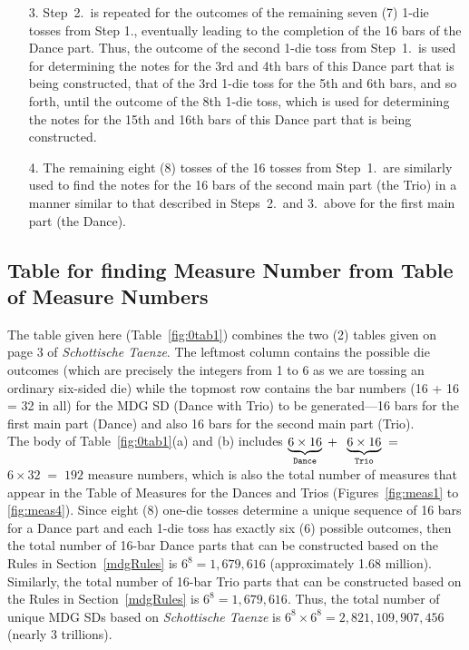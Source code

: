\documentclass[a4paper,x11names,svgnames,10pt]{article}
\begin{document}
{\begin{enumerate}
	\item[3.\label{step3}] Step~2.\ is repeated for the outcomes of the remaining seven (7) 1-die tosses from Step 1., eventually leading to the completion of the 16 bars of the Dance part. Thus, the outcome of the second 1-die toss from Step~1.\ is used for determining the notes for the 3rd and 4th bars of this Dance part that is being constructed, that of the 3rd 1-die toss for the 5th and 6th bars, and so forth, until the outcome of the 8th 1-die toss, which is used for determining the notes for the 15th and 16th bars of this Dance part that is being constructed. 
	
	\item[4.] The remaining eight (8) tosses of the 16 tosses from Step~1.\ are similarly used to find the notes for the 16 bars of the second main part (the Trio) in a manner similar to that described in Steps~2.\ and 3.\ above for the first main part (the Dance).
\end{enumerate}   

\subsection{Table for finding Measure Number from Table of Measure Numbers}\label{tabFind}
The table given here (Table~\ref{fig:0tab1}) combines the two (2) tables given on page 3 of {\it Schottische Taenze}.  The leftmost column contains the possible die outcomes (which are precisely the integers from 1 to 6 as we are tossing an ordinary six-sided die) while the topmost row contains the bar numbers (16 + 16 = 32 in all) for the MDG SD (Dance with Trio) to be generated---16 bars for the first main part (Dance) and also 16 bars for the second main part (Trio).\\

The body of Table~\ref{fig:0tab1}(a) and (b) includes $\underbrace{6 \times 16}_{\tt Dance} \;+\;$ $\underbrace{6\times 16}_{\tt Trio} \;=\;$ $6\times 32 \;=\; 192$ measure numbers, which is also the total number of measures that appear in the Table of Measures for the Dances and Trios (Figures~\ref{fig:meas1} to \ref{fig:meas4}).  Since eight (8) one-die tosses determine a unique sequence of 16 bars for a Dance part and each 1-die toss has exactly six (6) possible outcomes, then the total number of 16-bar Dance parts that can be constructed based on the Rules in Section~\ref{mdgRules} is $6^{8} = 1,679,616$ (approximately 1.68 million). Similarly, the total number of 16-bar Trio parts that can be constructed based on the Rules in Section~\ref{mdgRules} is $6^{8} = 1,679,616$.  Thus, the total number of unique MDG SDs based on {\em Schottische Taenze} is $6^{8} \times 6^{8} = 2,\!821,\!109,\!907,\!456$ (nearly 3 trillions). \\


}
\end{document}
